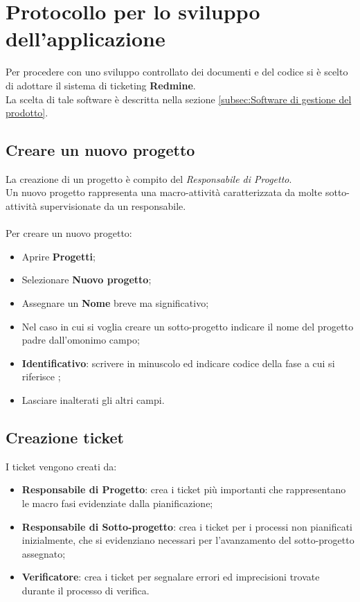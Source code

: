 \section{Protocollo per lo sviluppo dell'applicazione} 
Per procedere con uno sviluppo controllato dei documenti e del codice si \`{e} scelto di adottare il sistema di ticketing \textbf{Redmine}.\\ 
La scelta di tale software \`{e} descritta nella sezione \ref{subsec:Software di gestione del prodotto}.

\subsection{Creare un nuovo progetto} 

La creazione di un progetto \`{e} compito del \emph{Responsabile di Progetto}.\\ 
Un nuovo progetto rappresenta una macro-attivit\`{a} caratterizzata da molte sotto-attivit\`{a} 
supervisionate da un responsabile.\\\\ 
Per creare un nuovo progetto:
\begin{itemize}
\item Aprire \textbf{Progetti}; 
\item Selezionare \textbf{Nuovo progetto}; 
\item Assegnare un \textbf{Nome} breve ma significativo; 
\item Nel caso in cui si voglia creare un sotto-progetto indicare il nome del progetto padre dall’omonimo campo; 
\item \textbf{Identificativo}: scrivere in minuscolo ed indicare codice della fase a cui si riferisce ;
\item Lasciare inalterati gli altri campi. 
\end{itemize}
 
\subsection{Creazione ticket}
 
  I ticket vengono creati da:
 \begin{itemize}
 

    \item \textbf{Responsabile di Progetto}: crea i ticket pi\`{u} importanti che rappresentano le macro fasi evidenziate dalla pianificazione; 
	\item \textbf{Responsabile di Sotto-progetto}: crea i ticket per i processi non pianificati inizialmente, che si evidenziano necessari per l’avanzamento del sotto-progetto assegnato; 
	\item \textbf{Verificatore}: crea i ticket per segnalare errori ed imprecisioni trovate durante il processo di verifica. 
 \end{itemize}



